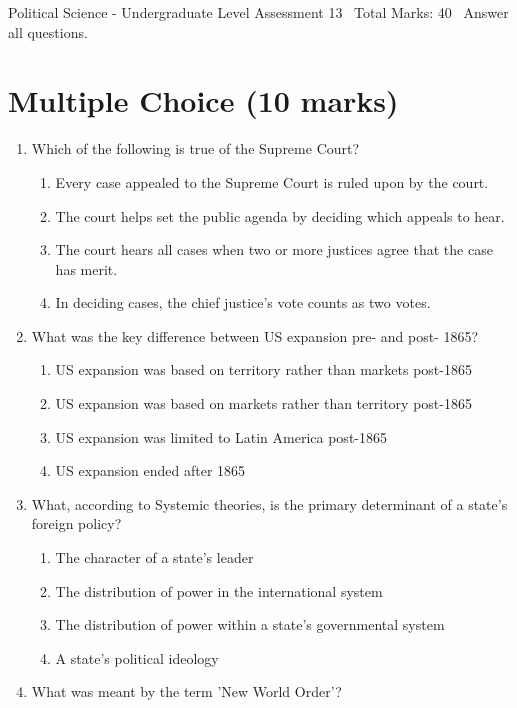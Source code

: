 \documentclass[12pt]{article}
\begin{document}
\begin{center}
Political Science - Undergraduate Level Assessment 13 \
Total Marks: 40 \
Answer all questions.
\end{center}

\section*{Multiple Choice (10 marks)}
\begin{enumerate}[label=\arabic*.]
\item Which of the following is true of the Supreme Court?
\begin{enumerate}[label=(\alph*)]
    \item Every case appealed to the Supreme Court is ruled upon by the court.
    \item The court helps set the public agenda by deciding which appeals to hear.
    \item The court hears all cases when two or more justices agree that the case has merit.
    \item In deciding cases, the chief justice's vote counts as two votes.
\end{enumerate}
\item What was the key difference between US expansion pre- and post- 1865?
\begin{enumerate}[label=(\alph*)]
    \item US expansion was based on territory rather than markets post-1865
    \item US expansion was based on markets rather than territory post-1865
    \item US expansion was limited to Latin America post-1865
    \item US expansion ended after 1865
\end{enumerate}
\item What, according to Systemic theories, is the primary determinant of a state's foreign policy?
\begin{enumerate}[label=(\alph*)]
    \item The character of a state's leader
    \item The distribution of power in the international system
    \item The distribution of power within a state's governmental system
    \item A state's political ideology
\end{enumerate}
\item What was meant by the term 'New World Order'?

\end{enumerate}
\end{document}

